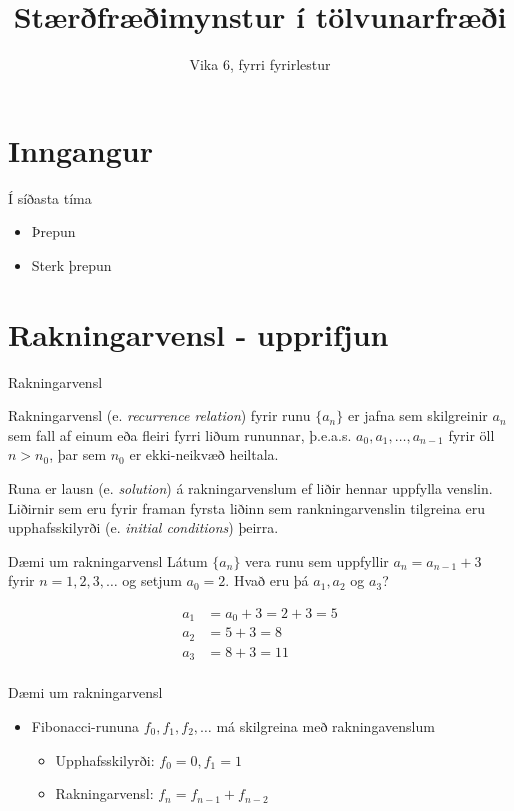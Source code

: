 \documentclass[handout]{beamer}
\title{Stærðfræðimynstur í tölvunarfræði}
\subtitle{Vika 6, fyrri fyrirlestur}
\begin{document}
\begin{frame}
\titlepage
\end{frame}


\section{Inngangur}

\begin{frame}{Í síðasta tíma}
\begin{itemize}
 \item Þrepun
 \item Sterk þrepun
\end{itemize}
\end{frame}

\section{Rakningarvensl - upprifjun}

\begin{frame}{Rakningarvensl}
\begin{tcolorbox}[title=Rakningarvensl]
Rakningarvensl (e. \emph{recurrence relation}) fyrir runu $\{a_n\}$ er jafna sem skilgreinir $a_n$ sem fall af einum eða fleiri fyrri liðum rununnar, þ.e.a.s. $a_0, a_1, \ldots, a_{n-1}$ fyrir öll $n > n_0$, þar sem $n_0$ er ekki-neikvæð heiltala.
\end{tcolorbox}
Runa er lausn (e. \emph{solution}) á rakningarvenslum ef liðir hennar uppfylla venslin. Liðirnir sem eru fyrir framan fyrsta liðinn sem rankningarvenslin tilgreina eru upphafsskilyrði (e. \emph{initial conditions}) þeirra.
\end{frame}

\begin{frame}{Dæmi um rakningarvensl}
Látum $\{a_n\}$ vera runu sem uppfyllir $a_n = a_{n-1} + 3$ fyrir $n=1, 2, 3, \ldots$ og setjum $a_0 = 2$. Hvað eru þá $a_1, a_2$ og $a_3$? \pause

\begin{align*}
a_1 &= a_0 + 3 = 2 + 3 = 5\\
a_2 &= 5 + 3 = 8\\
a_3 &= 8 + 3 = 11\\
\end{align*}

\end{frame}

\begin{frame}{Dæmi um rakningarvensl}
\begin{itemize}
 \item Fibonacci-rununa $f_0, f_1, f_2, \ldots$ má skilgreina með rakningavenslum
 \begin{itemize}
  \item Upphafsskilyrði: $f_0 = 0, f_1 = 1$
  \item Rakningarvensl: $f_n = f_{n-1} + f_{n-2}$
 \end{itemize}
\end{itemize}
\end{frame}
\end{document}
